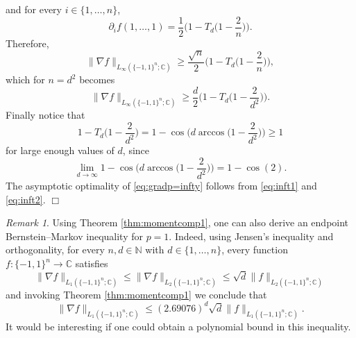 \documentclass[11pt,reqno]{amsart}
\renewcommand{\leq}{\leqslant}
\renewcommand{\geq}{\geqslant}
\newcommand{\1}{\mathbf 1}
\theoremstyle{remark}
\newtheorem{remark}[theorem]{Remark}
\newcommand{\C}{\mathbb C}
\newcommand{\N}{\mathbb N}
\begin{document}
and for every $i\in\{1,\ldots,n\}$,
\begin{equation}
\partial_if(1,\ldots,1) = \frac{1}{2}\Big(1-T_d\Big(1-\frac{2}{n}\Big)\Big).
\end{equation}
Therefore,
\begin{equation}
\|\nabla f\|_{L_\infty(\{-1,1\}^n;\C)} \geq \frac{\sqrt{n}}{2} \Big(1-T_d\Big(1-\frac{2}{n}\Big)\Big),
\end{equation}
which for $n=d^2$ becomes
\begin{equation} \label{eq:inft1}
\|\nabla f\|_{L_\infty(\{-1,1\}^n;\C)} \geq \frac{d}{2} \Big(1-T_d\Big(1-\frac{2}{d^2}\Big)\Big).
\end{equation}
Finally notice that
\begin{equation} \label{eq:inft2}
1-T_d\Big(1-\frac{2}{d^2}\Big) = 1 - \cos\Big(d\arccos\Big(1-\frac{2}{d^2}\Big)\Big) \geq 1
\end{equation}
for large enough values of $d$, since
\begin{equation}
\lim_{d\to\infty} 1 - \cos\Big(d\arccos\Big(1-\frac{2}{d^2}\Big)\Big) = 1-\cos(2).
\end{equation}
The asymptotic optimality of \eqref{eq:gradp=infty} follows from \eqref{eq:inft1} and \eqref{eq:inft2}.
\hfill$\Box$

\medskip

\begin{remark} \label{rem:gradp=1}
Using Theorem \ref{thm:momentcomp1}, one can also derive an endpoint Bernstein--Markov inequality for $p=1$. Indeed, using Jensen's inequality and orthogonality, for every $n,d\in\N$ with $d\in\{1,\ldots,n\}$, every function $f:\{-1,1\}^n\to\C$ satisfies
\begin{equation}
\|\nabla f\|_{L_1(\{-1,1\}^n;\C)} \leq \|\nabla f\|_{L_2(\{-1,1\}^n;\C)} \leq \sqrt{d} \|f\|_{L_2(\{-1,1\}^n;\C)}
\end{equation}
and invoking Theorem \ref{thm:momentcomp1} we conclude that
\begin{equation}
\|\nabla f\|_{L_1(\{-1,1\}^n;\C)} \leq (2.69076)^d\sqrt{d} \|f\|_{L_1(\{-1,1\}^n;\C)}.
\end{equation}
It would be interesting if one could obtain a polynomial bound in this inequality.
\end{remark}
\end{document}
